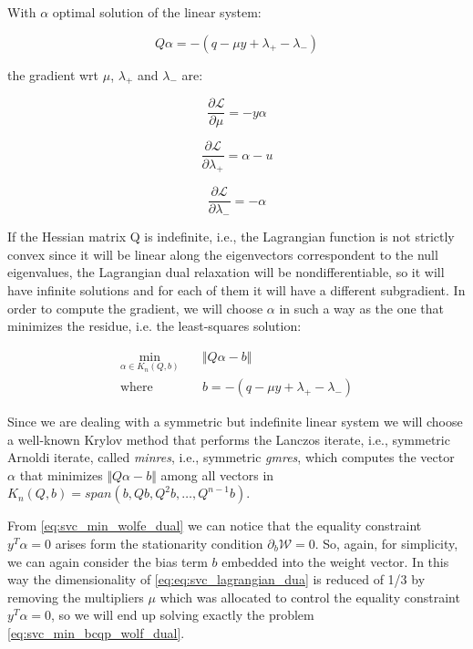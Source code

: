 With $\alpha$ optimal solution of the linear system:

\begin{equation} \label{eq:svc_lagrangian_sol}
    Q \alpha = - (q - \mu y + \lambda_+ - \lambda_-)
\end{equation}

the gradient wrt $\mu$, $\lambda_+$ and $\lambda_-$ are:

\begin{equation} \label{eq:svc_lagrangian_der_mu}
	\frac{\partial \mathcal{L}}{\partial \mu}=-y \alpha
\end{equation}

\begin{equation} \label{eq:svc_lagrangian_der_lp}
	\frac{\partial \mathcal{L}}{\partial \lambda_+}=\alpha - u
\end{equation}

\begin{equation} \label{eq:svc_lagrangian_der_lm}
    \frac{\partial \mathcal{L}}{\partial \lambda_-}=-\alpha
\end{equation}

If the Hessian matrix Q is indefinite, i.e., the Lagrangian function is not strictly convex since it will be linear along the eigenvectors correspondent to the null eigenvalues, the Lagrangian dual relaxation will be nondifferentiable, so it will have infinite solutions and for each of them it will have a different subgradient. In order to compute the gradient, we will choose $\alpha$ in such a way as the one that minimizes the residue, i.e. the least-squares solution:

\begin{equation} \label{eq:svc_lagrangian_krylov_sol}
	\begin{aligned}
			\min_{\alpha \in K_n(Q, b)} \quad & \Vert Q \alpha - b \Vert \\ 
			\textrm{where} \quad & b = - (q - \mu y + \lambda_+ - \lambda_-)
	\end{aligned}
\end{equation}

Since we are dealing with a symmetric but indefinite linear system we will choose a well-known Krylov method that performs the Lanczos iterate, i.e., symmetric Arnoldi iterate, called \emph{minres}, i.e., symmetric \emph{gmres}, which computes the vector $\alpha$ that minimizes $\Vert Q \alpha - b \Vert$ among all vectors in $K_n(Q, b) = span(b, Qb, Q^2b, \dots, Q^{n-1}b)$.

From \ref{eq:svc_min_wolfe_dual} we can notice that the equality constraint $y^T \alpha = 0$ arises form the stationarity condition $\partial_{{b}} \mathcal{W}=0$. So, again, for simplicity, we can again consider the bias term $b$ embedded into the weight vector. In this way the dimensionality of \ref{eq:eq:svc_lagrangian_dua} is reduced of 1/3 by removing the multipliers $\mu$ which was allocated to control the equality constraint $y^T \alpha=0$, so we will end up solving exactly the problem \ref{eq:svc_min_bcqp_wolf_dual}.


